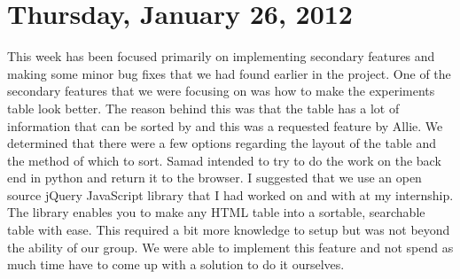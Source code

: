 \documentclass{article}
\begin{document}
\section{Thursday, January 26, 2012} %
This week has been focused primarily on implementing secondary features and making some minor bug fixes that
we had found earlier in the project. One of the secondary features that we were focusing on was how to make 
the experiments table look better. The reason behind this was that the table has a lot of information that 
can be sorted by and this was a requested feature by Allie. We determined that there were a few options 
regarding the layout of the table and the method of which to sort. Samad intended to try to do the work on the
back end in python and return it to the browser. I suggested that we use an open source jQuery JavaScript 
library that I had worked on and with at my internship. The library enables you to make any HTML table into a 
sortable, searchable table with ease. This required a bit more knowledge to setup but was not beyond the 
ability of our group. We were able to implement this feature and not spend as much time have to come up with
a solution to do it ourselves.
\end{document}
